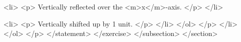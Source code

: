                                     <li>
                                        <p>
                                            Vertically reflected over the <m>x</m>-axis.
                                        </p>
                                    </li>

                                    <li>
                                        <p>
                                            Vertically shifted up by 1 unit.
                                        </p>
                                    </li>
                                </ol>
                            </p>
                        </li>
                    </ol>
                </p>
            </statement>
        </exercise>
    </subsection>
</section>